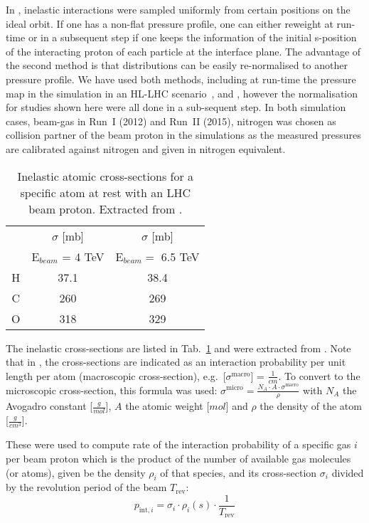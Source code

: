 In \fluka, inelastic interactions were sampled uniformly from certain positions on the ideal orbit. If one has a non-flat pressure profile, one can either reweight at run-time or in a subsequent step if one keeps the information of the initial s-position of the interacting proton of each particle at the interface plane. The advantage of the second method is that distributions can be easily re-normalised to another pressure profile. We have used both methods, including at run-time the pressure map in the simulation in an HL-LHC scenario~\cite{kweeIpac14}, and , however the normalisation for studies shown here were all done in a sub-sequent step. In both simulation cases, beam-gas in Run~I (2012) and Run~II (2015), nitrogen was chosen as collision partner of the beam proton in the simulations as the measured pressures are calibrated against nitrogen and given in nitrogen equivalent.

\begin{table}
   \centering
   \caption{Inelastic atomic cross-sections for a specific atom at rest with an LHC beam proton. Extracted from \fluka.}
   \begin{tabular}{c|c|c}\hline
     &  $\sigma$ [mb] &  $\sigma$ [mb] \\
       & E$_{beam}$ = 4 TeV   & E$_{beam} =$ 6.5 TeV \\ \hline\hline
       H & 37.1 & 38.4 \\
       C & 260& 269 \\
       O & 318 & 329 \\
       \hline
   \end{tabular}
   \label{tab:atomicXsections}
\end{table}

The inelastic cross-sections are listed in Tab.~\ref{tab:atomicXsections} and were extracted from \fluka. Note that in \fluka, the cross-sections are indicated as an interaction probability per unit length per atom (macroscopic cross-section), e.g.~[$\sigma^{\textrm{macro}}$] = $\frac{1}{cm}$. To convert to the microscopic cross-section, this formula was used: $\sigma^{\textrm{micro}} = \frac{N_A \cdot A \cdot \sigma^{\textrm{macro}}}{\rho}$ with $N_A$ the Avogadro constant [$\frac{g}{mol}$], $A$ the atomic weight [$mol$] and $\rho$ the density of the atom [$\frac{g}{cm^3}$].

These were used to compute rate of the interaction probability of a specific gas $i$ per beam proton which is the product of the number of available gas molecules (or atoms), given be the density $\rho_i$ of that species, and its cross-section $\sigma_i$ divided by the revolution period of the beam $T_{\mathrm{rev}}$:
\begin{equation} \label{eq2}
p_{\mathrm{int},i} = \sigma_{i} \cdot \rho_{i}(s) \cdot \frac{1}{T_{\mathrm{rev}}}
\end{equation}

